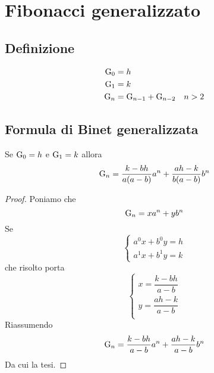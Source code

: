\chapter{Fibonacci generalizzato}
\section{Definizione}
\begin{defn}
	\begin{align}
		\mathrm{G}_{0}={}&h\notag\\
		\mathrm{G}_{1}={}&k\notag\\
		\mathrm{G}_{n}={}&\mathrm{G}_{n-1}+\mathrm{G}_{n-2}\quad n>2\label{eqn:FiboGendef}
	\end{align}
\end{defn}
\section{Formula di Binet generalizzata}
\begin{thm}
Se $\mathrm{G}_{0}={}h$ e $\mathrm{G}_{1}={}k$ allora \begin{equation}
	\mathrm{G}_{n}={}\dfrac{k-bh}{a(a-b)}a^n+\dfrac{ah-k}{b(a-b)}b^n
\end{equation}\label{eqn:FormulaBinetgeneralizzata}
\end{thm}
\begin{proof}
Poniamo che \begin{equation}
	\mathrm{G}_{n}=xa^n+yb^n
\end{equation} Se
\begin{equation*}
	\left\{
	\begin{array}{l}
		a^0x+b^0y=h\\ a^1x+b^1y=k
	\end{array}
	\right.
\end{equation*}
che risolto porta
\begin{equation*}
	\left\{
	\begin{array}{l}
		x=\dfrac{k-bh}{a-b}\\y=\dfrac{ah-k}{a-b}\\
	\end{array}
	\right.
\end{equation*}
Riassumendo
 \begin{equation*}
	\mathrm{G}_{n}={}\dfrac{k-bh}{a-b}a^n+\dfrac{ah-k}{a-b}b^n
\end{equation*}
Da cui la tesi.
\end{proof}
